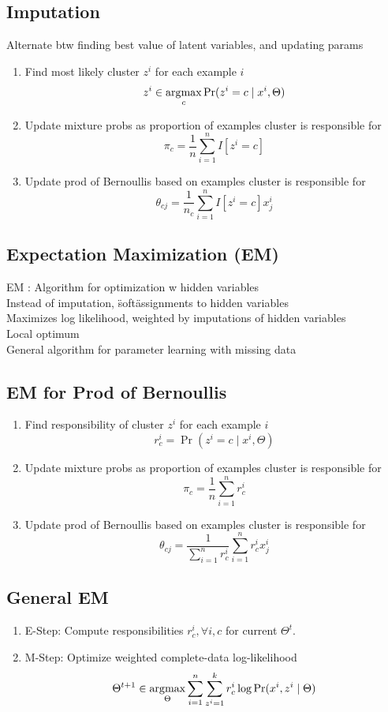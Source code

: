 \subsection*{Imputation}
Alternate btw finding best value of latent variables, and updating params
\begin{enumerate}
    \item Find most likely cluster $z^i$ for each example $i$
    \[z^i\in\operatorname*{\arg\!\max}_c\Pr(z^i=c\mid x^i,\Theta)\]
    \item Update mixture probs as proportion of examples cluster is responsible for
    \[\pi_c=\frac{1}{n}\sum_{i=1}^n I[z^i=c]\]
    \item Update prod of Bernoullis based on examples cluster is responsible for
    \[\theta_{cj}=\frac{1}{n_c}\sum_{i=1}^n I[z^i=c] x_j^i\]
\end{enumerate}
\subsection*{Expectation Maximization (EM)}
EM : Algorithm for optimization w hidden variables\\
Instead of imputation, \"soft\" assignments to hidden variables\\
Maximizes log likelihood, weighted by imputations of hidden variables\\
Local optimum\\
General algorithm for parameter learning with missing data
\subsection*{EM for Prod of Bernoullis}
\begin{enumerate}
    \item Find responsibility of cluster $z^i$ for each example $i$
    \[r_c^i=\Pr(z^i=c\mid x^i,\Theta)\]
    \item Update mixture probs as proportion of examples cluster is responsible for
    \[\pi_c=\frac{1}{n}\sum_{i=1}^n r_c^i\]
    \item Update prod of Bernoullis based on examples cluster is responsible for
    \[\theta_{cj}=\frac{1}{\sum_{i=1}^n r_c^i}\sum_{i=1}^n r_c^i x_j^i\]
\end{enumerate}
\subsection*{General EM}
\begin{enumerate}
    \item E-Step: Compute responsibilities $r_c^i,\forall i,c$ for current $\Theta^t$.
    \item M-Step: Optimize weighted complete-data log-likelihood
    \[\Theta^{t+1}\in\operatorname*{\arg\!\max}_{\Theta}\sum_{i=1}^n\sum_{z^i=1}^k r_c^i \log\Pr(x^i,z^i\mid\Theta)\]
\end{enumerate}
